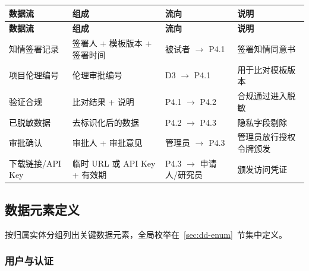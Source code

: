 {\small
\begin{longtable}{|p{28mm}|p{52mm}|p{30mm}|p{22mm}|}
\hline
\textbf{数据流} & \textbf{组成} & \textbf{流向} & \textbf{说明}\\\hline
\endfirsthead
\hline
\textbf{数据流} & \textbf{组成} & \textbf{流向} & \textbf{说明}\\\hline
\endhead
知情签署记录 & 签署人 + 模板版本 + 签署时间 & 被试者 $\to$ P4.1 & 签署知情同意书 \\ \hline
项目伦理编号 & 伦理审批编号 & D3 $\to$ P4.1 & 用于比对模板版本 \\ \hline
验证合规 & 比对结果 + 说明 & P4.1 $\to$ P4.2 & 合规通过进入脱敏 \\ \hline
已脱敏数据 & 去标识化后的数据 & P4.2 $\to$ P4.3 & 隐私字段剔除 \\ \hline
审批确认 & 审批人 + 审批意见 & 管理员 $\to$ P4.3 & 管理员放行授权令牌颁发 \\ \hline
下载链接/API Key & 临时 URL 或 API Key + 有效期 & P4.3 $\to$ 申请人/研究员 & 颁发访问凭证 \\ \hline
\end{longtable}
}

\subsection{数据元素定义}
\label{sec:dd-element}

按归属实体分组列出关键数据元素，全局枚举在~\ref{sec:dd-enum}~节集中定义。

\subsubsection{用户与认证}

